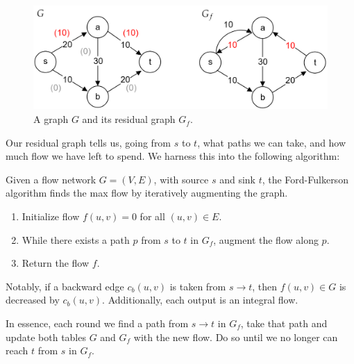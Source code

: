 \vspace{-1em}
\begin{figure}[h]
    \centering
    \includegraphics[width=.8\textwidth]{Sections/net/res.png}
    \caption{A graph $G$ and its residual graph $G_f$.}
\end{figure}

\noindent
Our residual graph tells us, going from $s$ to $t$, what paths we can take, and how much flow we have left to spend.
We harness this into the following algorithm:
\begin{theo}

    Given a flow network $G=(V,E)$, with source $s$ and sink $t$, the Ford-Fulkerson algorithm finds the max flow by iteratively augmenting the graph.
    \begin{enumerate}
        \item Initialize flow $f(u,v) = 0$ for all $(u,v) \in E$.
        \item While there exists a path $p$ from $s$ to $t$ in $G_f$, augment the flow along $p$.
        \item Return the flow $f$.
    \end{enumerate}

    \noindent
    Notably, if a backward edge $c_b(u,v)$ is taken from $s\to t$, then $f(u,v)\in G$ is decreased by $c_b(u,v)$.
    Additionally, each output is an integral flow.
\end{theo}
\newpage 

\noindent
In essence, each round we find a path from $s\to t$ in $G_f$, take that path and update both tables $G$ and $G_f$ with the new flow. Do 
so until we no longer can reach $t$ from $s$ in $G_f$.

